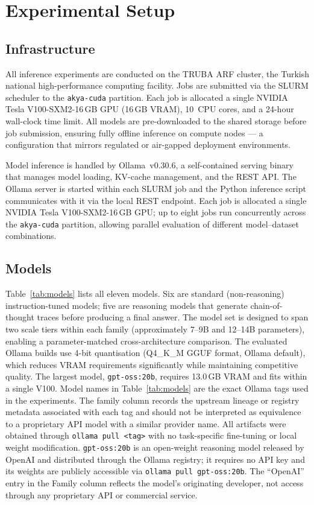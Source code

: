 \documentclass[journal]{IEEEtran}
\begin{document}
\section{Experimental Setup}
\label{sec:setup}

\subsection{Infrastructure}

All inference experiments are conducted on the TRUBA ARF cluster,
the Turkish national high-performance computing facility. Jobs are
submitted via the SLURM scheduler to the \texttt{akya-cuda} partition.
Each job is allocated a single NVIDIA Tesla V100-SXM2-16\,GB GPU
(16\,GB VRAM), 10~CPU cores, and a 24-hour wall-clock time limit.
All models are pre-downloaded to the shared storage before job submission,
ensuring fully offline inference on compute nodes — a configuration
that mirrors regulated or air-gapped deployment environments.

Model inference is handled by Ollama~v0.30.6, a self-contained
serving binary that manages model loading, KV-cache management,
and the REST API. The Ollama server is started within each SLURM
job and the Python inference script communicates with it via
the local REST endpoint. Each job is allocated a single NVIDIA
Tesla V100-SXM2-16\,GB GPU; up to eight jobs run concurrently
across the \texttt{akya-cuda} partition, allowing parallel
evaluation of different model--dataset combinations.

\subsection{Models}

Table~\ref{tab:models} lists all eleven models. Six are standard
(non-reasoning) instruction-tuned models; five are reasoning models
that generate chain-of-thought traces before producing a final answer.
The model set is designed to span two scale tiers within each family
(approximately 7--9B and 12--14B parameters), enabling a parameter-matched
cross-architecture comparison. The evaluated Ollama builds use 4-bit
quantisation (Q4\_K\_M GGUF format, Ollama default), which reduces
VRAM requirements significantly while maintaining competitive quality.
The largest model, \texttt{gpt-oss:20b}, requires 13.0\,GB VRAM and
fits within a single V100.
Model names in Table~\ref{tab:models} are the exact Ollama tags used
in the experiments. The family column records the upstream lineage or
registry metadata associated with each tag and should not be interpreted
as equivalence to a proprietary API model with a similar provider name.
All artifacts were obtained through \texttt{ollama pull <tag>} with no
task-specific fine-tuning or local weight modification.
\texttt{gpt-oss:20b} is an open-weight reasoning model released by
OpenAI and distributed through the Ollama registry; it requires no API
key and its weights are publicly accessible via
\texttt{ollama pull gpt-oss:20b}.
The ``OpenAI'' entry in the Family column reflects the model's
originating developer, not access through any proprietary API or
commercial service.
\end{document}
